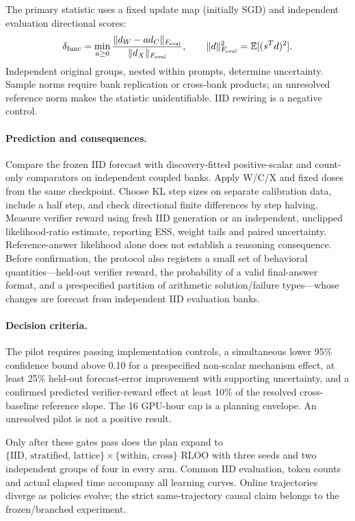 The primary statistic uses a fixed update map (initially SGD) and independent
evaluation directional scores:
\begin{equation}
\delta_{\rm func}=\min_{a\ge0}
\frac{\|d_W-a d_C\|_{F_{\rm eval}}}{\|d_X\|_{F_{\rm eval}}},\qquad
\|d\|_{F_{\rm eval}}^2=\mathbb{E}[(s^Td)^2].
\end{equation}
Independent original groups, nested within prompts, determine uncertainty.
Sample norms require bank replication or cross-bank products; an unresolved
reference norm makes the statistic unidentifiable. IID rewiring is a negative control.

\paragraph{Prediction and consequences.}
Compare the frozen IID forecast with discovery-fitted positive-scalar and count-only
comparators on independent coupled banks. Apply W/C/X and fixed doses from the same
checkpoint. Choose KL step sizes on separate calibration data, include a half step,
and check directional finite differences by step halving. Measure verifier reward
using fresh IID generation or an independent, unclipped likelihood-ratio estimate,
reporting ESS, weight tails and paired uncertainty. Reference-answer likelihood alone
does not establish a reasoning consequence. Before confirmation, the protocol also
registers a small set of behavioral quantities---held-out verifier reward, the
probability of a valid final-answer format, and a prespecified partition of
arithmetic solution/failure types---whose changes are forecast from independent IID
evaluation banks.

\paragraph{Decision criteria.}
The pilot requires passing implementation controls, a simultaneous lower 95\%
confidence bound above 0.10 for a prespecified non-scalar mechanism effect,
at least 25\% held-out forecast-error improvement with supporting uncertainty,
and a confirmed predicted verifier-reward effect at least 10\% of the resolved
cross-baseline reference slope. The 16 GPU-hour cap is a planning envelope.
An unresolved pilot is not a positive result.

Only after these gates pass does the plan expand to
$\{\text{IID, stratified, lattice}\}\times\{\text{within, cross}\}$ RLOO with
three seeds and two independent groups of four in every arm. Common IID evaluation,
token counts and actual elapsed time accompany all learning curves. Online trajectories
diverge as policies evolve; the strict same-trajectory causal claim belongs to the
frozen/branched experiment.
